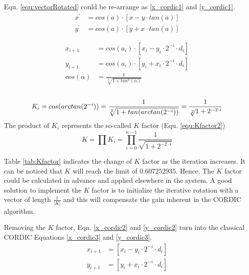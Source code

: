 Equ. \eqref{equ:vectorRotated} could be re-arrange as \eqref{x_cordic1} and \eqref{y_cordic1}.
\begin{align}
 x^{'}		& 	=cos(a) \cdot [x-y \cdot tan(a)]	  \label{x_cordic1}\\
 y^{'}		&	=cos(a) \cdot  [y+x \cdot tan(a)]  \label{y_cordic1}
\end{align}




\begin{align}
 x_{i+1}	& 	=cos(a_i) \cdot  [x_{i}- y_i \cdot 2^{-i} \cdot d_i]	\label{x_cordic2} \\
y_{i+1}	&	=cos(a_i) \cdot  [y_{i} + x_i \cdot 2^{-i} \cdot d_i]	\label{y_cordic2} \\
cos(\alpha) & = \frac{1}{\sqrt[2]{1+ tan^{2}(\alpha)}}   \label{equ:CosTanRelation}
\end{align}
\\[-11ex] %
\begin{equation}
K_{i}  =  cos(arctan(2^{-i})) = \frac{1}{\sqrt[2]{1+tan(arctan(2^{-i}))}} = \frac{1}{\sqrt[2]{}1+2^{-2 \cdot i}} \label{equ:Kfactor}\\
\end{equation}
The product of $K_{i}$ represents the so-called $K$ factor (Equ. \ref{equ:Kfactor2})
\begin{equation}
K=\prod K_i = \prod^{n-1}_{i=0} \frac{1}{\sqrt{1+2^{-2 \cdot i}}}
\label{equ:Kfactor2}
\end{equation}

Table \ref{tab:Kfactor} indicates the change of $K$ factor as the iteration increases. It can be noticed that $K$ will reach the limit of $0.607252935$. Hence, The $K$ factor could be calculated in advance and applied elsewhere in the system. A good solution to implement the $K$ factor is to initialize the iterative rotation with a vector of length $\frac{1}{|K|}$ and this will compensate the gain inherent in the CORDIC algorithm.



Removing the $K$ factor, Eqn. \eqref{x_cordic2} and \eqref{y_cordic2} turn into the classical CORDIC Equations \eqref{x_cordic3} and \eqref{y_cordic3}.
\begin{align}
 x_{i+1}	&	= [x_{i}- y_i \cdot 2^{-i} \cdot d_i]	\label{x_cordic3}	\\
y_{i+1}	&	=  [y_{i} + x_i \cdot 2^{-i} \cdot d_i]	\label{y_cordic3}
\end{align}

